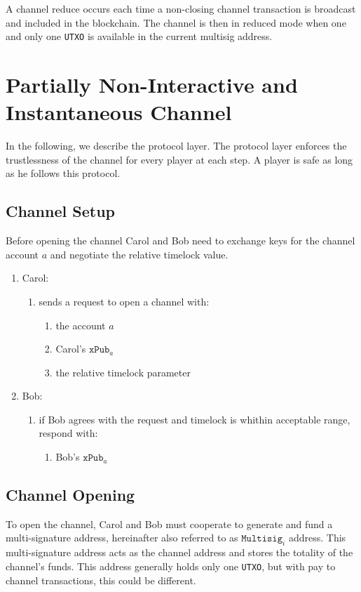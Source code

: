 \documentclass{llncs}
\begin{document}
\begin{definition} A channel reduce occurs each time a
non-closing channel transaction is broadcast and included in the blockchain. The
channel is then in reduced mode when one and only one \texttt{UTXO} is available
in the current multisig address.
\end{definition}

\section{Partially Non-Interactive and Instantaneous Channel}

In the following, we describe the protocol layer. The protocol layer enforces
the trustlessness of the channel for every player at each step. A player is safe
as long as he follows this protocol.

\subsection{Channel Setup} Before opening the channel Carol and Bob need to
exchange keys for the channel account $a$ and negotiate the relative timelock
value.

\begin{enumerate}
\item Carol:
  \begin{enumerate}
  \item sends a request to open a channel with:
    \begin{enumerate}
    \item the account $a$
    \item Carol's $\texttt{xPub}_{a}$
    \item the relative timelock parameter
    \end{enumerate}
  \end{enumerate}
\item Bob:
  \begin{enumerate}
  \item if Bob agrees with the request and timelock is whithin acceptable range,
respond with:
    \begin{enumerate}
    \item Bob's $\texttt{xPub}_{a}$
    \end{enumerate}
  \end{enumerate}
\end{enumerate}

\subsection{Channel Opening} To open the channel, Carol and Bob must cooperate
to generate and fund a multi-signature address, hereinafter also referred to as
$\texttt{Multisig}_{i}$ address. This multi-signature address acts as the
channel address and stores the totality of the channel's funds. This address
generally holds only one \texttt{UTXO}, but with pay to channel transactions,
this could be different.
\end{document}
